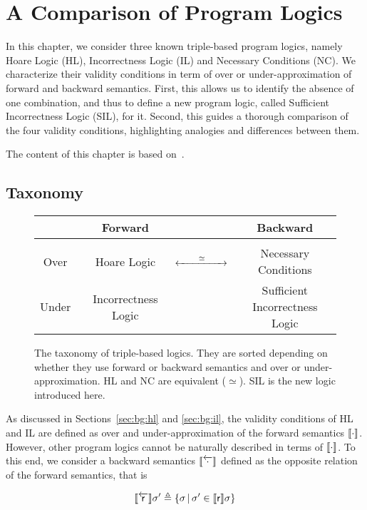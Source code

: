 
\chapter{A Comparison of Program Logics}\label{ch:sil}
In this chapter, we consider three known triple-based program logics, namely Hoare Logic (HL), Incorrectness Logic (IL) and Necessary Conditions (NC). We characterize their validity conditions in term of over or under-approximation of forward and backward semantics. First, this allows us to identify the absence of one combination, and thus to define a new program logic, called Sufficient Incorrectness Logic (SIL), for it. Second, this guides a thorough comparison of the four validity conditions, highlighting analogies and differences between them.

The content of this chapter is based on~\cite{ABGL24}.

\section{Taxonomy}
\begin{figure}[t]
	\centering
	\begin{tabular}{c|ccc}
		& Forward & & Backward\\[3pt]
		\hline &&& \\[-5pt]
		\quad Over\quad\  &\quad Hoare Logic  & $\xleftrightarrow{\qquad\simeq\qquad}$ & Necessary Conditions \\ [5pt]
		\quad Under\quad\  & \quad Incorrectness Logic & & \textcolor{ACMBlue}{Sufficient Incorrectness Logic}
	\end{tabular}
	\caption{The taxonomy of triple-based logics. They are sorted depending on whether they use forward or backward semantics and over or under-approximation. HL and NC are equivalent ($\simeq$). SIL is the new logic introduced here.}
	\label{fig:sil:taxonomy}
\end{figure}

As discussed in Sections~\ref{sec:bg:hl} and \ref{sec:bg:il}, the validity conditions of HL and IL are defined as over and under-approximation of the forward semantics $\llbracket\cdot\rrbracket$. However, other program logics cannot be naturally described in terms of $\llbracket\cdot\rrbracket$. To this end, we consider a backward semantics $\llbracket\overleftarrow{\cdot}\rrbracket$ defined as the opposite relation of the forward semantics, that is

\begin{equation}
	\llbracket\overleftarrow{\mathsf{r}}\rrbracket \sigma' \triangleq \{ \sigma \,\vert\, \sigma' \in \llbracket\mathsf{r}\rrbracket \sigma \} \label{eq:sil:bwsem-definition}
\end{equation}

